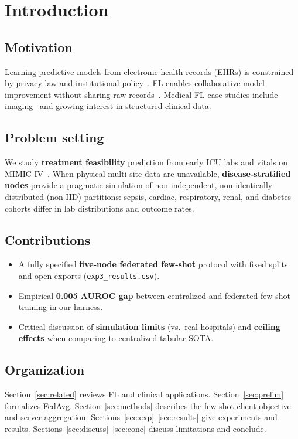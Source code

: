 \section{Introduction}
\label{sec:intro}

\subsection{Motivation}
Learning predictive models from electronic health records (EHRs) is constrained by privacy law and institutional policy~\citep{ghassemi2021practical,rieke2020future}. FL enables collaborative model improvement without sharing raw records~\citep{mcmahan2017communication,kairouz2021advances}. Medical FL case studies include imaging~\citep{sheller2020federated} and growing interest in structured clinical data.

\subsection{Problem setting}
We study \textbf{treatment feasibility} prediction from early ICU labs and vitals on MIMIC-IV~\citep{johnson2023mimic}. When physical multi-site data are unavailable, \textbf{disease-stratified nodes} provide a pragmatic simulation of non-independent, non-identically distributed (non-IID) partitions: sepsis, cardiac, respiratory, renal, and diabetes cohorts differ in lab distributions and outcome rates.

\subsection{Contributions}
\begin{itemize}
  \item A fully specified \textbf{five-node federated few-shot} protocol with fixed splits and open exports (\texttt{exp3\_results.csv}).
  \item Empirical \textbf{0.005 AUROC gap} between centralized and federated few-shot training in our harness.
  \item Critical discussion of \textbf{simulation limits} (vs.\ real hospitals) and \textbf{ceiling effects} when comparing to centralized tabular SOTA.
\end{itemize}

\subsection{Organization}
Section~\ref{sec:related} reviews FL and clinical applications. Section~\ref{sec:prelim} formalizes FedAvg. Section~\ref{sec:methods} describes the few-shot client objective and server aggregation. Sections~\ref{sec:exp}--\ref{sec:results} give experiments and results. Sections~\ref{sec:discuss}--\ref{sec:conc} discuss limitations and conclude.
